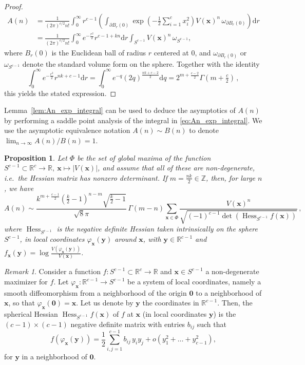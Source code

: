 \documentclass[a4paper,oneside]{amsart}
\newcommand{\bb}[1]{\boldsymbol{#1}}
\numberwithin{theorem}{section}
\newtheorem{proposition}[theorem]{Proposition}
\theoremstyle{remark}
\newtheorem{remark}[theorem]{Remark}
\newcommand{\R}{\mathbb{R}}
\newcommand{\Z}{\mathbb{Z}}
\renewcommand{\d}{\mathrm{d}}
\DeclareMathOperator{\Hess}{Hess}
\begin{document}
\begin{proof}
\begin{align*}
    A(n) & = \frac{1}{(2\pi)^{c/2} n!} \int_{0}^{\infty} r^{c-1} \left( \int_{\partial B_r(0)} \exp\left( -\frac{1}{2} \sum_{i=1}^{c} x_i^2 \right) V(\bb{x})^{n} \,\omega_{\partial B_r(0)} \right) \d r\\
    & = \frac{1}{(2\pi)^{c/2} n!} \int_{0}^{\infty} e^{-\frac{r^2}{2}} r^{c-1 + kn} \d r \int_{S^{c-1}} V(\bb{x})^{n} \,\omega_{S^{c-1}},
  \end{align*}
  where $B_r(0)$ is the Euclidean ball of radius $r$ centered at $0$, and $\omega_{\partial B_r(0)}$ or $\omega_{S^{c-1}}$ denote the standard volume form on the sphere.
  Together with the identity
  \[
    \int_{0}^{\infty} e^{-\frac{r^2}{2}} r^{nk+c-1} \d r = \int_{0}^{\infty} e^{-q} (2q)^{\frac{nk + c-2}{2}} \d q = 2^{m + \frac{c-2}{2}} \Gamma\left(m + \tfrac{c}{2}\right)\,,
  \]
  this yields the stated expression.
\end{proof}


Lemma~\ref{lem:An_exp_integral} can be used to deduce the asymptotics of $A(n)$ by performing a saddle point analysis of the integral in \eqref{eq:An_exp_integral}. 
We use the asymptotic equivalence notation
$A(n) \sim B(n)$  to denote $\lim_{n\rightarrow \infty} A(n)/B(n) = 1$.


\begin{proposition}
  \label{prop:asymptotics_critical_V}
  Let $\Phi$ be the set of global maxima of the function $S^{c-1}\subset \R^c \rightarrow \R,~ \bb{x}\mapsto |V(\bb{x})|$, 
  and assume that all of these are non-degenerate, i.e.\ the Hessian matrix has nonzero determinant. If $m = \frac{nk}{2}\in\Z$, then, for large $n$, we have
  \begin{equation}
    \label{eq:asymptotics_sphere}
    A(n) \sim \frac{k^{m + \frac{c-1}{2}} \left(\frac{k}{2}-1\right)^{n-m}\sqrt{\frac{k}{2}-1} }{\sqrt{8}\pi}\, \Gamma\!\left(m-n \right) \sum_{\bb{x}\in\Phi} \frac{V(\bb{x})^{n}}{\sqrt{(-1)^{c-1} \det(\Hess_{S^{c-1}} f(\bb x))}}\, ,
  \end{equation}
  where $\Hess_{S^{c-1}}$ is the negative definite Hessian taken intrinsically on the sphere $S^{c-1}$, in local coordinates $\varphi_{\bb x}(\bb y)$ around $\bb x$, with $\bb y \in \R^{c-1}$ and $f_{\bb x}(\bb y) = \log \frac{V(\varphi_{\bb x}(\bb{y}))}{V(\bb{x})}$. 
\end{proposition}

\begin{remark}
    Consider a function $f:S^{c-1}\subset \R^c\to \R$ and $\bb x \in S^{c-1}$ a non-degenerate maximizer for $f$. Let $\varphi_{\bb x}:\R^{c-1}\to S^{c-1}$ be a system of local coordinates, namely a smooth diffeomorphism from a neighborhood of the origin $\bb 0$ to a neighborhood of $\bb x$, so that $\varphi_{\bb x}(\bb 0) = \bb x$. Let us denote by $\bb y$ the coordinates in $\R^{c-1}$. Then, the spherical Hessian $\Hess_{S^{c-1}}f (\bb{x})$ of $f$ at $\bb{x}$ (in local coordinates $\bb{y}$) is the $(c-1)\times (c-1)$ negative definite matrix with entries $b_{ij}$ such that 
    \[
    f(\varphi_{\bb x}(\bb{y})) = \frac{1}{2} \sum_{i,j=1}^{c-1} b_{ij}\, y_i  y_j + o(y_1^2 + \dots + y_{c-1}^2),
    \]
    for $\bb y$ in a neighborhood of $\bb 0$.
\end{remark}
\end{document}
